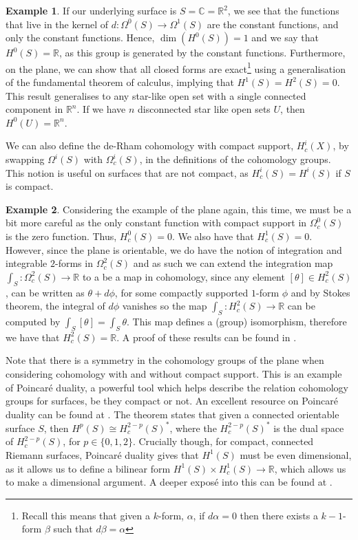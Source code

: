 \documentclass[11pt]{report}
\theoremstyle{definition}
\newtheorem*{example*}{Example}
\begin{document}
\begin{example*}
  If our underlying surface is $S=\mathbb{C}=\mathbb{R}^2$, we see that the functions that live in the kernel of $d:\Omega^0(S)\rightarrow\Omega^1(S)$ are the constant functions, and only the constant functions. Hence, $\dim(H^0(S)) = 1$ and we say that $H^0(S)=\mathbb{R}$, as this group is generated by the constant functions. Furthermore, on the plane, we can show that all closed forms are exact\footnote{Recall this means that given a $k$-form, $\alpha$, if $d\alpha = 0$ then there exists a $k-1$-form $\beta$ such that $d\beta = \alpha$} using a generalisation of the fundamental theorem of calculus, implying that $H^1(S)=H^2(S) = 0$. This result generalises to any star-like open set with a single connected component in $\mathbb{R}^n$. If we have $n$ disconnected star like open sets $U$, then $H^0(U)=\mathbb{R}^n$.
\end{example*}
We can also define the de-Rham cohomology with compact support, $H^i_c(X)$, by swapping $\Omega^i(S)$ with $\Omega_c^i(S)$, in the definitions of the cohomology groups. This notion is useful on surfaces that are not compact, as $H^i_c(S) = H^i(S)$ if $S$ is compact.
\begin{example*}
  Considering the example of the plane again, this time, we must be a bit more careful as the only constant function with compact support in $\Omega^0_c(S)$ is the zero function. Thus, $H^0_c(S)=0$. We also have that $H^1_c(S)=0$. However, since the plane is orientable, we do have the notion of integration and integrable $2$-forms in $\Omega^2_c(S)$ and as such we can extend the integration map $\int_S : \Omega^2_c(S) \rightarrow \mathbb{R}$ to a be a map in cohomology, since any element $[\theta] \in H^2_c(S)$, can be written as $\theta + d\phi$, for some compactly supported $1$-form $\phi$ and by Stokes theorem, the integral of $d\phi$ vanishes so the map $\int_S:H^2_c(S)\rightarrow \mathbb{R}$
  can be computed by $\int_S [\theta] = \int_S \theta$. This map defines a (group) isomorphism, therefore we have that $H^2_c(S)=\mathbb{R}$. A proof of these results can be found in \cite[Theorem 10.13]{calcohomo}.
\end{example*}
Note that there is a symmetry in the cohomology groups of the plane when considering cohomology with and without compact support. This is an example of Poincar\'{e} duality, a powerful tool which helps describe the relation cohomology groups for surfaces, be they compact or not. An excellent resource on Poincar\'{e} duality can be found at \cite[Chapter 13]{calcohomo}. The theorem states that given a connected orientable surface $S$, then $H^p(S) \cong H^{2-p}_c(S)^*$, where the $H^{2-p}_c(S)^*$ is the dual space of $H^{2-p}_c(S)$, for $p \in \{0,1,2\}$.
Crucially though, for compact, connected Riemann surfaces, Poincar\'{e} duality gives that $H^1(S)$ must be even dimensional, as it allows us to define a bilinear form $H^1(S)\times H^1_c(S) \rightarrow \mathbb{R}$, which allows us to make a dimensional argument. A deeper expos\'{e} into this can be found at \cite[p.130]{calcohomo}.
\end{document}
